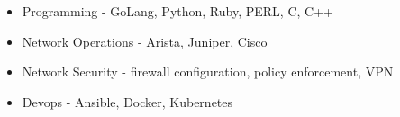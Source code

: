 

\begin{itemize}
\item Programming - GoLang, Python, Ruby, PERL, C, C++
\item Network Operations - Arista, Juniper, Cisco
\item Network Security - firewall configuration, policy enforcement, VPN
\item Devops - Ansible, Docker, Kubernetes
\end{itemize}

